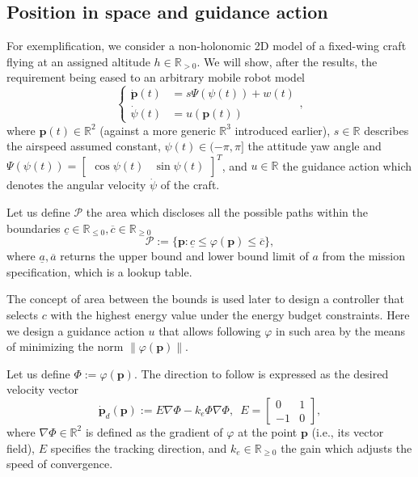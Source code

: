 \documentclass[letterpaper,10pt,conference]{ieeeconf}
\begin{document}
\subsection{Position in space and guidance action}
\label{sec:position}

For exemplification, we consider a non-holonomic 2D model of a fixed-wing craft flying at an assigned altitude $h\in\mathbb{R}_{>0}$. We will show, after the results, the requirement being eased to an arbitrary mobile robot model
\begin{equation}\label{eqq:1}\begin{cases}
  \dot{\mathbf{p}}(t)&=s\Psi(\psi(t))+w(t)\\
  \dot{\psi}(t)&=u(\mathbf{p}(t))
\end{cases},
\end{equation}
where $\mathbf{p}(t)\in\mathbb{R}^2$ (against a more generic $\mathbb{R}^3$ introduced earlier), $s\in\mathbb{R}$ describes the airspeed assumed constant, $\psi(t)\in(-\pi,\pi]$ the attitude yaw angle and $\Psi(\psi(t))=\begin{bmatrix}\cos{\psi(t)} & \sin{\psi(t)}\end{bmatrix}^T$, and $u\in\mathbb{R}$ the guidance action which denotes the angular velocity $\dot{\psi}$ of the craft.

Let us define $\mathcal{P}$ the area which discloses all the possible paths within the boundaries $\underline{c}\in\mathbb{R}_{\leq 0},\overline{c}\in\mathbb{R}_{\geq 0}$
\begin{equation}\label{eqq:2}
  \mathcal{P}:=\{\mathbf{p}:\underline{c}\leq\varphi(\mathbf{p})\leq\overline{c}\},
\end{equation}
where $\underline{a},\overline{a}$ returns the upper bound and lower bound limit of $a$ from the mission specification, which is a lookup table.

The concept of area between the bounds is used later to design a controller that selects $c$ with the highest energy value under the energy budget constraints. Here we design a guidance action $u$ that allows following $\varphi$ in such area by the means of minimizing the norm $\|\varphi(\mathbf{p})\|$.

Let us define $\varPhi:=\varphi(\mathbf{p})$. The direction to follow is expressed as the desired velocity vector
\begin{equation}\label{eqq:3}
  \dot{\mathbf{p}}_d(\mathbf{p}):=E\nabla\varPhi-k_e\varPhi\nabla\varPhi,\,\,\,E=\begin{bmatrix}
    0&1\\-1&0
  \end{bmatrix},
\end{equation}
where $\nabla\varPhi\in\mathbb{R}^2$ is defined as the gradient of $\varphi$ at the point $\mathbf{p}$ (i.e., its vector field), $E$ specifies the tracking direction, and $k_e\in\mathbb{R}_{\geq 0}$ the gain which adjusts the speed of convergence.
\end{document}
